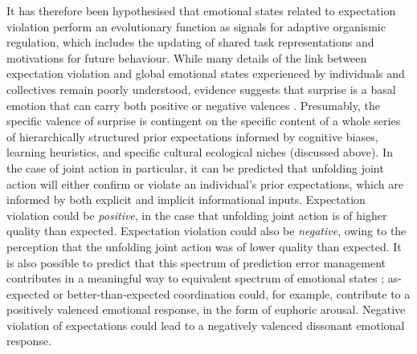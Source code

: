\begin{CJK}{UTF8}{gbsn}
It has therefore been hypothesised that emotional states related to expectation violation perform an evolutionary function as signals for adaptive organismic regulation, which includes the updating of shared task representations and motivations for future behaviour\citep{Cosmides2000,Barrett2017}.  While many details of the link between expectation violation and global emotional states experienced by individuals and collectives remain poorly understood, evidence suggests that surprise is a basal emotion that can carry both positive or negative valences \citep{Ortony1990}. Presumably, the specific valence of surprise is contingent on the specific content of a whole series of hierarchically structured prior expectations informed by cognitive biases, learning heuristics, and specific cultural ecological niches (discussed above).  In the case of joint action in particular, it can be predicted that unfolding joint action will either confirm or violate an individual's prior expectations, which are informed by both explicit and implicit informational inputs.
Expectation violation could be \textit{positive}, in the case that unfolding joint action is of higher quality than expected.  Expectation violation could also be \textit{negative}, owing to the perception that the unfolding joint action was of lower quality than expected.  It is also possible to predict that this spectrum of prediction error management contributes in a meaningful way to equivalent spectrum of emotional states \citep{Pessoa2014};  as-expected or better-than-expected coordination could, for example, contribute to a positively valenced emotional response, in the form of euphoric arousal.  Negative violation of expectations could lead to a negatively valenced dissonant emotional response.



\end{CJK}

